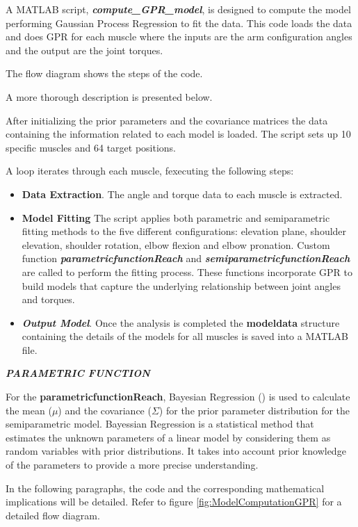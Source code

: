 A MATLAB script, \textbf{\textit{compute\_GPR\_model}}, is designed to compute the model performing Gaussian Process Regression to fit the data. This code loads the data and does GPR for each muscle where the inputs are the arm configuration angles and the output are the joint torques.

The flow diagram shows the steps of the code.

A more thorough description is presented below.

After initializing the prior parameters and the covariance matrices the data containing the information related to each model is loaded. The script sets up 10 specific muscles and 64 target positions. 

A loop iterates through each muscle, fexecuting the following steps:

\begin{itemize}
    \item \textbf{Data Extraction}. The angle and torque data to each muscle is extracted.
    \item \textbf{Model Fitting} The script applies both parametric and semiparametric fitting methods to the five different configurations: elevation plane, shoulder elevation, shoulder rotation, elbow flexion and elbow pronation. Custom function \textbf{\textit{parametricfunctionReach}} and \textbf{\textit{semiparametricfunctionReach}} are called to perform the fitting process. These functions incorporate GPR to build models that capture the underlying relationship between joint angles and torques.
    \item \textbf{\textit{Output Model}}. Once the analysis is completed the \textbf{modeldata} structure containing the details of the models for all muscles is saved into a MATLAB file. 
\end{itemize}

\textbf{\textit{PARAMETRIC FUNCTION}}

For the \textbf{parametricfunctionReach}, Bayesian Regression (\cite{BLM}) is used to calculate the mean ($\mu$) and the covariance ($\Sigma$) for the prior parameter distribution for the semiparametric model. Bayessian Regression is a statistical method that estimates the unknown parameters of a linear model by considering them as random variables with prior distributions. It takes into account prior knowledge of the parameters to provide a more precise understanding.

In the following paragraphs, the code and the corresponding mathematical implications will be detailed.  Refer to figure \ref{fig:ModelComputationGPR} for a detailed flow diagram.


